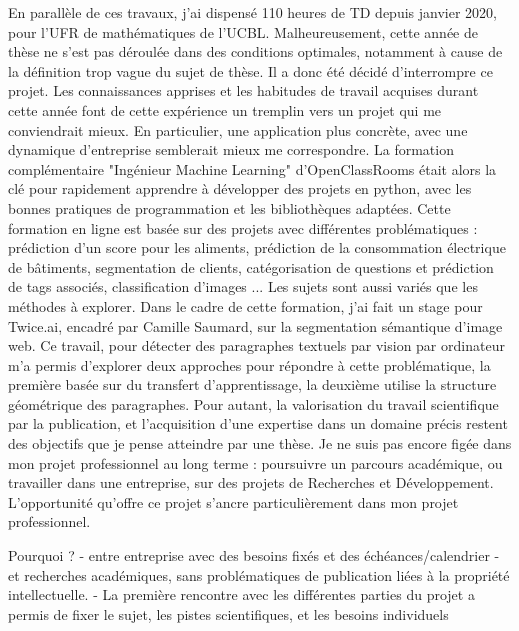 \documentclass[a4paper,11pt]{article}
\begin{document}
% 
En parallèle de ces travaux, j'ai dispensé 110 heures de TD depuis janvier 2020, pour l'UFR de mathématiques de l'UCBL. 
Malheureusement, cette année de thèse ne s'est pas déroulée dans des conditions optimales, notamment à cause de la définition trop vague du sujet de thèse. 
%
Il a donc été décidé d'interrompre ce projet. %
%
Les connaissances apprises et les habitudes de travail acquises durant cette année font de cette expérience un tremplin vers un projet qui me conviendrait mieux. En particulier, une application plus concrète, avec une dynamique d'entreprise semblerait mieux me correspondre. La formation complémentaire "Ingénieur Machine Learning" d'OpenClassRooms était alors la clé pour rapidement apprendre à développer des projets en python, avec les bonnes pratiques de programmation et les bibliothèques adaptées. 
Cette formation en ligne est basée sur des projets avec différentes problématiques : prédiction d'un score pour les aliments, prédiction de la consommation électrique de bâtiments, segmentation de clients, catégorisation de questions et prédiction de tags associés, classification d'images ... Les sujets sont aussi variés que les méthodes à explorer. Dans le cadre de cette formation, j'ai fait un stage pour Twice.ai, encadré par Camille Saumard, sur la segmentation sémantique d'image web. Ce travail, pour détecter des paragraphes textuels par vision par ordinateur m'a permis d'explorer deux approches pour répondre à cette problématique, la première basée sur du transfert d'apprentissage, la deuxième utilise la structure géométrique des paragraphes. 
%
Pour autant, la valorisation du travail scientifique par la publication, et l'acquisition d'une expertise dans un domaine précis restent des objectifs que je pense atteindre par une thèse. 
%
Je ne suis pas encore figée dans mon projet professionnel au long terme : poursuivre un parcours académique, ou travailler dans une entreprise, sur des projets de Recherches et Développement.
%
\\



L'opportunité qu'offre ce projet s'ancre particulièrement dans mon projet professionnel. 

Pourquoi ? 
- entre entreprise avec des besoins fixés et des échéances/calendrier
- et recherches académiques, sans problématiques de publication liées à la propriété intellectuelle. 
- La première rencontre avec les différentes parties du projet a permis de fixer le sujet, les pistes scientifiques, et les besoins individuels
\end{document}
